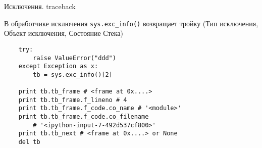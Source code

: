 \documentclass{article}
\begin{document}
\begin{center} Исключения. traceback \end{center}
	В обработчике исключения \lstinline!sys.exc_info()! возвращает тройку
		(Тип исключения, Объект исключения, Состояние Стека)

\begin{lstlisting}
	try:
	    raise ValueError("ddd")
	except Exception as x:
		tb = sys.exc_info()[2]

	print tb.tb_frame # <frame at 0x....>
	print tb.tb_frame.f_lineno # 4
	print tb.tb_frame.f_code.co_name # '<module>'
	print tb.tb_frame.f_code.co_filename 
		# '<ipython-input-7-492d537cf800>'
	print tb.tb_next # <frame at 0x....> or None
	del tb
\end{lstlisting}
\newpage

\end{document}
